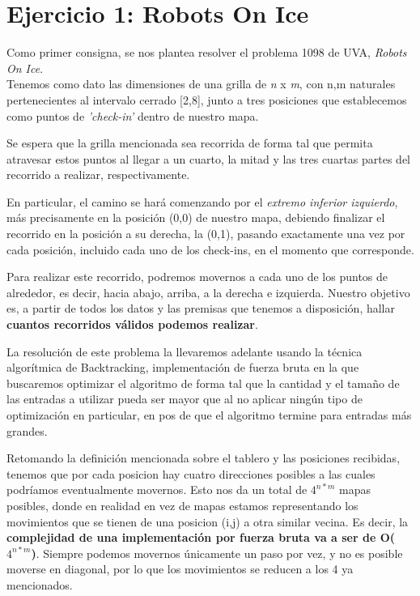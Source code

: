 \documentclass[./main.tex]{subfiles}
\begin{document}
\section{Ejercicio 1: Robots On Ice}

Como primer consigna, se nos plantea resolver el problema 1098 de UVA, \textit{Robots On Ice}. \\

Tenemos como dato las dimensiones de una grilla de \textit{n} x \textit{m}, con n,m naturales pertenecientes al intervalo cerrado [2,8], junto a tres posiciones que establecemos como puntos de \textit{'check-in'} dentro de nuestro mapa. 

Se espera que la grilla mencionada sea recorrida de forma tal que permita atravesar estos puntos al llegar a un cuarto, la mitad y las tres cuartas partes del recorrido a realizar, respectivamente. 

En particular, el camino se hará comenzando por el \textit{extremo inferior izquierdo}, más precisamente en la posición (0,0) de nuestro mapa, debiendo finalizar el recorrido en la posición a su derecha, la (0,1), pasando exactamente una vez por cada posición, incluido cada uno de los check-ins, en el momento que corresponde. 

Para realizar este recorrido, podremos movernos a cada uno de los puntos de alrededor, es decir, hacia abajo, arriba, a la derecha e izquierda.
Nuestro objetivo es, a partir de todos los datos y las premisas que tenemos a disposición, hallar \textbf{cuantos recorridos válidos podemos realizar}.  \newline

La resolución de este problema la llevaremos adelante usando la técnica algorítmica de Backtracking, implementación de fuerza bruta en la que buscaremos optimizar el algoritmo de forma tal que la cantidad y el tamaño de las entradas a utilizar pueda ser mayor que al no aplicar ningún tipo de optimización en particular, en pos de que el algoritmo termine para entradas más grandes. \newline

Retomando la definición mencionada sobre el tablero y las posiciones recibidas, tenemos que por cada posicion hay cuatro direcciones posibles a las cuales podríamos eventualmente movernos. Esto nos da un total de $4^{n*m}$ mapas posibles, donde en realidad en vez de mapas estamos representando los movimientos que se tienen de una posicion (i,j) a otra similar vecina. Es decir, la \textbf{complejidad de una implementación por fuerza bruta va a ser de O($4^{n*m}$)}. 
Siempre podemos movernos únicamente un paso por vez, y no es posible moverse en diagonal, por lo que los movimientos se reducen a los 4 ya mencionados. \newline
\end{document}
